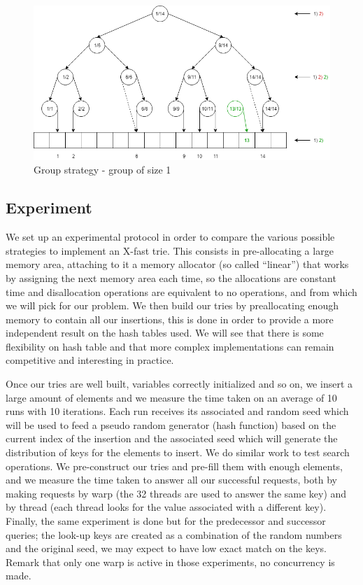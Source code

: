 \begin{figure}[!ht]
\centering
\includegraphics[width=\linewidth]{Chapters/XFastTries/Implementation/GroupStrategy.png} 
\caption{Group strategy - group of size 1}
\end{figure}

\subsection{Experiment}

We set up an experimental protocol in order to compare the various possible strategies to implement an X-fast trie. This consists in pre-allocating a large memory area, attaching to it a memory allocator (so called ``linear'') that works by assigning the next memory area each time, so the allocations are constant time and disallocation operations are equivalent to no operations, and from which we will pick for our problem. We then build our tries by preallocating enough memory to contain all our insertions, this is done in order to provide a more independent result on the hash tables used. We will see that there is some flexibility on hash table and that more complex implementations can remain competitive and interesting in practice.

Once our tries are well built, variables correctly initialized and so on, we insert a large amount of elements and we measure the time taken on an average of 10 runs with 10 iterations. Each run receives its associated and random seed which will be used to feed a pseudo random generator (hash function) based on the current index of the insertion and the associated seed which will generate the distribution of keys for the elements to insert. We do similar work to test search operations. We pre-construct our tries and pre-fill them with enough elements, and we measure the time taken to answer all our successful requests, both by making requests by warp (the 32 threads are used to answer the same key) and by thread (each thread looks for the value associated with a different key). Finally, the same experiment is done but for the predecessor and successor queries; the look-up keys are created as a combination of the random numbers and the original seed, we may expect to have low exact match on the keys. Remark that only one warp is active in those experiments, no concurrency is made.

